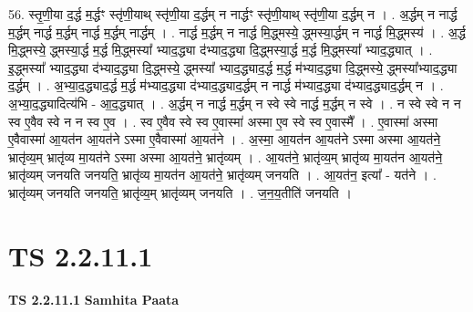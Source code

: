 \documentclass[17pt]{extarticle}
\begin{document}
56. स्तृ॒णी॒या द॒र्द्ध म॒र्द्धꣳ स्तृ॑णी॒याथ् स्तृ॑णी॒या द॒र्द्धम् न नार्द्धꣳ स्तृ॑णी॒याथ् स्तृ॑णी॒या द॒र्द्धम् न । . अ॒र्द्धम् न नार्द्ध म॒र्द्धम् नार्द्ध म॒र्द्धम् नार्द्ध म॒र्द्धम् नार्द्धम् । . नार्द्ध म॒र्द्धम् न नार्द्ध मि॒द्ध्मस्ये॒ द्ध्मस्या॒र्द्धम् न नार्द्ध मि॒द्ध्मस्य॑ । . अ॒र्द्ध मि॒द्ध्मस्ये॒ द्ध्मस्या॒र्द्ध म॒र्द्ध मि॒द्ध्मस्या᳚ भ्याद॒द्ध्या द॑भ्याद॒द्ध्या दि॒द्ध्मस्या॒र्द्ध म॒र्द्ध मि॒द्ध्मस्या᳚ भ्याद॒द्ध्यात् । . इ॒द्ध्मस्या᳚ भ्याद॒द्ध्या द॑भ्याद॒द्ध्या दि॒द्ध्मस्ये॒ द्ध्मस्या᳚ भ्याद॒द्ध्याद॒र्द्ध म॒र्द्ध म॑भ्याद॒द्ध्या दि॒द्ध्मस्ये॒ द्ध्मस्या᳚भ्याद॒द्ध्या द॒र्द्धम् । . अ॒भ्या॒द॒द्ध्याद॒र्द्ध म॒र्द्ध म॑भ्याद॒द्ध्या द॑भ्याद॒द्ध्याद॒र्द्धम् न नार्द्ध म॑भ्याद॒द्ध्या 
द॑भ्याद॒द्ध्याद॒र्द्धम् न । . अ॒भ्या॒द॒द्ध्यादित्य॑भि - आ॒द॒द्ध्यात् । . अ॒र्द्धम् न नार्द्ध म॒र्द्धम् न स्वे स्वे नार्द्ध म॒र्द्धम् न स्वे । . न स्वे स्वे न न स्व ए॒वैव स्वे न न स्व ए॒व । . स्व ए॒वैव स्वे स्व ए॒वास्मा॑ अस्मा ए॒व स्वे स्व ए॒वास्मै᳚ । . ए॒वास्मा॑ अस्मा ए॒वैवास्मा॑ आ॒यत॑न आ॒यत॑ने ऽस्मा ए॒वैवास्मा॑ आ॒यत॑ने । . अ॒स्मा॒ आ॒यत॑न आ॒यत॑ने ऽस्मा अस्मा आ॒यत॑ने॒ भ्रातृ॑व्य॒म् भ्रातृ॑व्य मा॒यत॑ने ऽस्मा अस्मा आ॒यत॑ने॒ भ्रातृ॑व्यम् । . आ॒यत॑ने॒ भ्रातृ॑व्य॒म् भ्रातृ॑व्य मा॒यत॑न आ॒यत॑ने॒ भ्रातृ॑व्यम् जनयति जनयति॒ भ्रातृ॑व्य मा॒यत॑न आ॒यत॑ने॒ भ्रातृ॑व्यम् जनयति । . आ॒यत॑न॒ इत्या᳚ - यत॑ने । . भ्रातृ॑व्यम् जनयति जनयति॒ भ्रातृ॑व्य॒म् भ्रातृ॑व्यम् जनयति । . ज॒न॒य॒तीति॑ जनयति । \newline
\pagebreak
{}

\section{ TS 2.2.11.1 }

\textbf{TS 2.2.11.1 } \newline
\textbf{Samhita Paata} \newline
\end{document}

